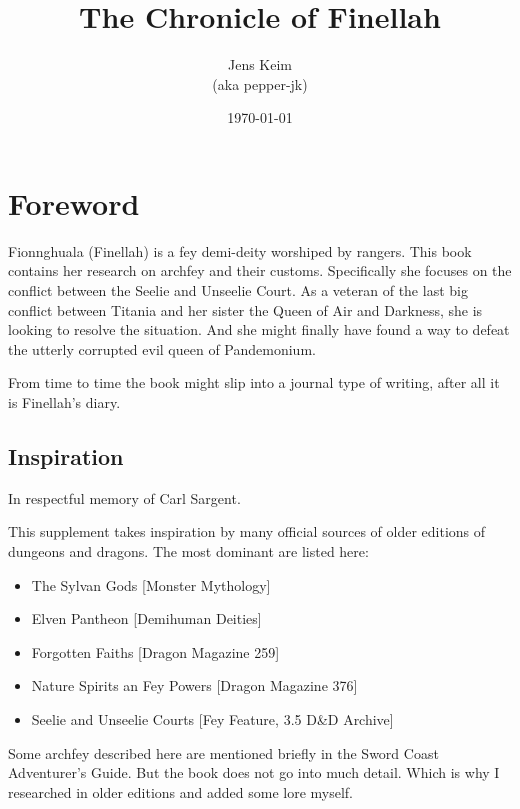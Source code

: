 \documentclass[letter,10pt,twocolumn,openany]{dndbook}
\title{The Chronicle of Finellah}
\author{Jens Keim\\(aka pepper-jk)}
\date{\today}
\begin{document}
\frontmatter

\maketitle

\tableofcontents

\mainmatter

\section{Foreword}

Fionnghuala (Finellah) is a fey demi-deity worshiped by rangers.
This book contains her research on archfey and their customs.
Specifically she focuses on the conflict between the Seelie and Unseelie Court.
As a veteran of the last big conflict between Titania and her sister the Queen of Air and Darkness,
she is looking to resolve the situation.
And she might finally have found a way to defeat the utterly corrupted evil queen of Pandemonium.

From time to time the book might slip into a journal type of writing,
after all it is Finellah's diary.

\subsection{Inspiration}

In respectful memory of Carl Sargent.

This supplement takes inspiration by many official sources of older editions of dungeons and dragons.
The most dominant are listed here:

\begin{itemize}
    \item The Sylvan Gods [Monster Mythology]
    \item Elven Pantheon [Demihuman Deities]
    \item Forgotten Faiths [Dragon Magazine 259]
    \item Nature Spirits an Fey Powers [Dragon Magazine 376]
    \item Seelie and Unseelie Courts [Fey Feature, 3.5 D\&D Archive]
\end{itemize}

Some archfey described here are mentioned briefly in the Sword Coast Adventurer's Guide.
But the book does not go into much detail.
Which is why I researched in older editions and added some lore myself.

\small
\end{document}
